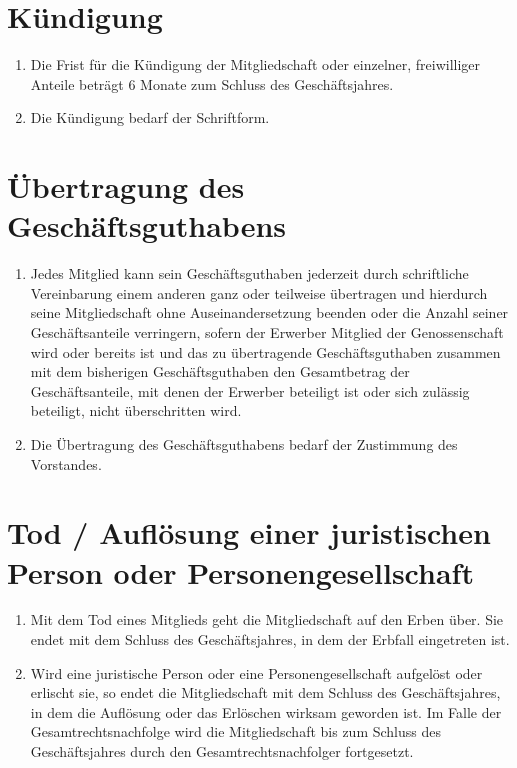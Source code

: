 \documentclass[a4paper, 12pt]{scrartcl}
\begin{document}
\section{Kündigung}
\begin{enumerate}
  \item Die Frist für die Kündigung der Mitgliedschaft oder einzelner, freiwilliger Anteile beträgt 6 Monate zum Schluss des Geschäftsjahres.
  \item Die Kündigung bedarf der Schriftform.
\end{enumerate}

\section{Übertragung des Geschäftsguthabens}
\begin{enumerate}
  \item Jedes Mitglied kann sein Geschäftsguthaben jederzeit durch schriftliche Vereinbarung einem anderen ganz oder teilweise übertragen und hierdurch seine Mitgliedschaft ohne Auseinandersetzung beenden oder die Anzahl seiner Geschäftsanteile verringern, sofern der Erwerber Mitglied der Genossenschaft wird oder bereits ist und das zu übertragende Geschäftsguthaben zusammen mit dem bisherigen Geschäftsguthaben den Gesamtbetrag der Geschäftsanteile, mit denen der Erwerber beteiligt ist oder sich zulässig beteiligt, nicht überschritten wird.
  \item Die Übertragung des Geschäftsguthabens bedarf der Zustimmung des Vorstandes.
\end{enumerate}

\section{Tod / Auflösung einer juristischen Person oder Personengesellschaft}
\begin{enumerate}
  \item Mit dem Tod eines Mitglieds geht die Mitgliedschaft auf den Erben über. Sie endet mit dem Schluss des Geschäftsjahres, in dem der Erbfall eingetreten ist.
  \item Wird eine juristische Person oder eine Personengesellschaft aufgelöst oder erlischt sie, so endet die Mitgliedschaft mit dem Schluss des Geschäftsjahres, in dem die Auflösung oder das Erlöschen wirksam geworden ist. Im Falle der Gesamtrechtsnachfolge wird die Mitgliedschaft bis zum Schluss des Geschäftsjahres durch den Gesamtrechtsnachfolger fortgesetzt.
\end{enumerate}
\end{document}
